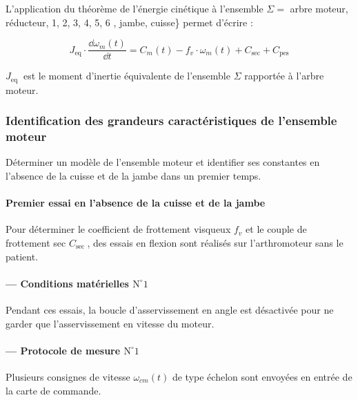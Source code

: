 L'application du théorème de l'énergie cinétique à l'ensemble $\Sigma=$ arbre moteur, réducteur, 1, 2, 3, 4, 5, 6 , jambe, cuisse\} permet d'écrire :

$$
J_{\mathrm{eq}} \cdot \frac{\dd \omega_{m}(t)}{\dd t}=C_{m}(t)-f_{v} \cdot \omega_{m}(t)+C_{\mathrm{sec}}+C_{\mathrm{pes}} %
$$

$J_{\text {eq }}$ est le moment d'inertie équivalente de l'ensemble $\Sigma$ rapportée à l'arbre moteur.


\subsubsection{Identification des grandeurs caractéristiques de l'ensemble moteur}

\begin{obj}
Déterminer un modèle de l'ensemble moteur et identifier ses constantes en l'absence de la cuisse et de la jambe dans un premier temps.
\end{obj}

\paragraph*{Premier essai en l'absence de la cuisse et de la jambe}
Pour déterminer le coefficient de frottement visqueux $f_{v}$ et le couple de frottement sec $C_{\text {sec }}$, des essais en flexion sont réalisés sur l'arthromoteur sans le patient.

\paragraph*{— Conditions matérielles $\mathrm{N}^{\circ} 1$}
Pendant ces essais, la boucle d'asservissement en angle est désactivée pour ne garder que l'asservissement en vitesse du moteur.

\paragraph*{— Protocole de mesure $\mathrm{N}^{\circ} 1$}
Plusieurs consignes de vitesse $\omega_{c m}(t)$ de type échelon sont envoyées en entrée de la carte de commande.

